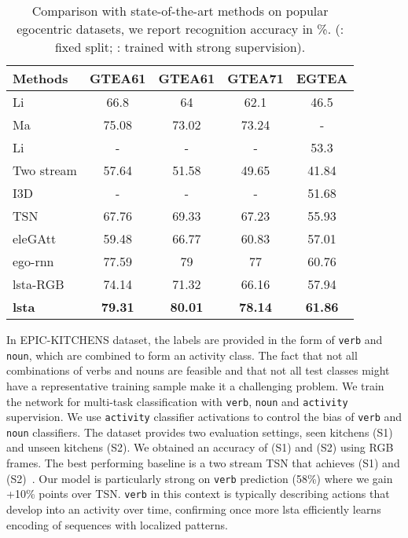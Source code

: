 \documentclass[10pt,twocolumn,letterpaper]{article}
\begin{document}
\begin{matrix*}[r]
	\begin{table}[t]\small
		\begin{center}\setlength{\tabcolsep}{4pt} 
			\begin{tabular}{|l|c|c|c|c|}
				\hline
Methods & GTEA61 & GTEA61 & GTEA71 & EGTEA\\
\hline
				Li \etal \cite{li2015delving} & 66.8 & 64 & 62.1 & 46.5 \\
				\hline
				Ma \etal \cite{ma2016deeper} & 75.08 & 73.02 & 73.24 & - \\
				\hline
				Li \etal \cite{li2018eye} & - & - & - & 53.3\\
				\hline
				Two stream \cite{simonyan2014two} & 57.64 & 51.58 & 49.65 & 41.84 \\
				\hline
				I3D \cite{carreira2017quo} & - & - & - & 51.68 \\
				\hline
				TSN \cite{TSN2016ECCV}  & 67.76 & 69.33 & 67.23 & 55.93 \\ 
				\hline
				eleGAtt \cite{attention_eccv18} & 59.48 & 66.77 & 60.83 & 57.01 \\
\hline
				ego-rnn \cite{sudhakaran2018attention} & 77.59 & 79 & 77 & 60.76 \\
				\hline
				\ac{lsta}-RGB & 74.14 & 71.32 & 66.16
 & 57.94 \\
				\hline
				\textbf{\ac{lsta}} & \textbf{79.31} & \textbf{80.01} & \textbf{78.14} & \textbf{61.86} \\
				\hline
			\end{tabular}
		\end{center}
		\vspace{-0.6cm}
		\caption{Comparison with state-of-the-art methods on popular egocentric datasets, we report recognition accuracy in \%. (: fixed split; : trained with strong supervision).}
		\label{tab:res_table}\vspace{-0.5cm}
	\end{table}
	
	
In EPIC-KITCHENS dataset, the labels are provided in the form of \verb+verb+ and \verb+noun+, which are combined to form an activity class. The fact that not all combinations of verbs and nouns are feasible and that not all test classes might have a representative training sample make it a challenging problem. We train the network for multi-task classification with \verb+verb+, \verb+noun+ and \verb+activity+ supervision. We use \verb+activity+ classifier activations to control the bias of \verb+verb+ and \verb+noun+ classifiers. The dataset provides two evaluation settings, seen kitchens (S1) and unseen kitchens (S2). We obtained an accuracy of  (S1) and  (S2) using RGB frames. The best performing baseline is a two stream TSN that achieves  (S1) and  (S2)~\cite{Damen_2018_ECCV}. Our model is particularly strong on \verb+verb+ prediction (58\%) where we gain +10\% points over TSN. \verb+verb+ in this context is typically describing actions that develop into an activity over time, confirming once more \ac{lsta} efficiently learns encoding of sequences with localized patterns. 



\end{matrix*}
\end{document}
